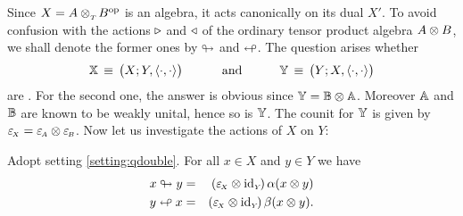 Since $X=A \otimes_{_T\!} B^{\rm op}$ is an algebra, it acts canonically on its dual $X'$.
To avoid confusion with the actions $\triangleright$ and $\triangleleft$ of the ordinary tensor product algebra
$A\otimes B$, we shall denote the former ones by $\looparrowright$ and $\looparrowleft$.
The question arises whether
\begin{equation}\label{eq:QD:def:XXYY}
   \XX  \,\equiv\,  \left(X; Y, \pairing \vertM\right)  \andspace{3em}
   \YY  \,\equiv\,  \left(Y; X, \pairing \vertM\right)
\end{equation}
are \contexts\@. For the second one, the answer is obvious since $\mathbb{Y} = \mathbb{B} \otimes \mathbb{A}$.
Moreover $\mathbb{A}$ and $\mathbb{B}$ are known to be weakly unital, hence so is $\mathbb{Y}$.
The counit for $\mathbb{Y}$ is given by $\varepsilon_{\scriptscriptstyle \! X} = \varepsilon_{\scriptscriptstyle \! A} \otimes \varepsilon_{\scriptscriptstyle \! B}$.
Now let us investigate the actions of $X$ on $Y$:

\begin{lemma} \label{lem:QD:formulas:twisted_actions}
Adopt setting \ref{setting:qdouble}\@.
For all\/ $x \in X$ and\/ $y \in Y$ we have
\begin{eqnarray}
x \looparrowright y  &=&  (\varepsilon_{\scriptscriptstyle \! X} \otimes \mbox{\rm id}_{\scriptscriptstyle Y\!})\, \alpha(x \otimes y)
\label{eq:QD:left_twisted_action}  \\
y \looparrowleft x  &=&  (\varepsilon_{\scriptscriptstyle \! X} \otimes \mbox{\rm id}_{\scriptscriptstyle Y\!})\,  \beta(x \otimes y).
\label{eq:QD:right_twisted_action}
\end{eqnarray}
\end{lemma}

